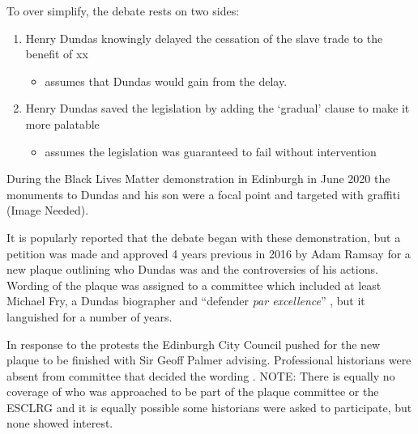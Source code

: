 \documentclass{scrartcl}
\begin{document}
To over simplify, the debate rests on two sides:

\begin{enumerate}
    \item Henry Dundas knowingly delayed the cessation of the slave trade to the benefit of xx
    \begin{itemize}
        \item assumes that Dundas would gain from the delay.
    \end{itemize}
    \item Henry Dundas saved the legislation by adding the `gradual' clause to make it more palatable 
    \begin{itemize}
        \item assumes the legislation was guaranteed to fail without intervention
    \end{itemize}
\end{enumerate}

During the Black Lives Matter demonstration in Edinburgh in June 2020 the monuments to Dundas and his son were a focal point and targeted with graffiti (Image Needed). 

It is popularly reported that the debate began with these demonstration, but a petition was made and approved 4 years previous in 2016 by Adam Ramsay \cite{mullen_2021} for a new plaque outlining who Dundas was and the controversies of his actions. Wording of the plaque was assigned to a committee which included at least Michael Fry, a Dundas biographer and ``defender \textit{par excellence}'' \cite{mccarthy_2022}, but it languished for a number of years.

In response to the protests the Edinburgh City Council pushed for the new plaque to be finished with Sir Geoff Palmer advising. Professional historians were absent from committee that decided the wording \cite{scotsman_2022}. NOTE: There is equally no coverage of who was approached to be part of the plaque committee or the ESCLRG and it is equally possible some historians were asked to participate, but none showed interest.
\end{document}
